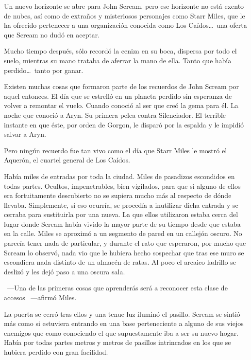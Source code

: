 \begin{prev}
    Un nuevo horizonte se abre para John Scream, pero ese horizonte no está exento de nubes, así como de extraños y misteriosos personajes como Starr Miles, que le ha ofrecido pertenecer a una organización conocida como Los Caídos\dots\ una oferta que Scream no dudó en aceptar.
\end{prev}

\noindent
Mucho tiempo después, sólo recordó la ceniza en su boca, dispersa por todo el suelo, mientras su mano trataba de aferrar la mano de ella. Tanto que había perdido\dots\ tanto por ganar.

\bigskip\noindent
Existen muchas cosas que formaron parte de los recuerdos de John Scream por aquel entonces. El día que se estrelló en un planeta perdido sin esperanza de volver a remontar el vuelo. Cuando conoció al ser que creó la gema para él. La noche que conoció a Aryn. Su primera pelea contra Silenciador. El terrible instante en que éste, por orden de Gorgon, le disparó por la espalda y le impidió salvar a Aryn.

Pero ningún recuerdo fue tan vivo como el día que Starr Miles le mostró el Aquerón, el cuartel general de Los Caídos.

Había miles de entradas por toda la ciudad. Miles de pasadizos escondidos en todas partes. Ocultos, impenetrables, bien vigilados, para que si alguno de ellos era fortuitamente descubierto no se supiera mucho más al respecto de dónde llevaba. Simplemente, si eso ocurría, se procedía a inutilizar dicha entrada y se cerraba para sustituirla por una nueva. La que ellos utilizaron estaba cerca del lugar donde Scream había vivido la mayor parte de su tiempo desde que estaba en la calle. Miles se aproximó a un segmento de pared en un callejón oscuro. No parecía tener nada de particular, y durante el rato que esperaron, por mucho que Scream lo observó, nada vio que le hubiera hecho sospechar que tras ese muro se escondiera nada distinto de un almacén de ratas. Al poco el arcaico ladrillo se deslizó y les dejó paso a una oscura sala.

~---Una de las primeras cosas que aprenderás será a reconocer esta clase de accesos ~---afirmó Miles.

La puerta se cerró tras ellos y una tenue luz iluminó el pasillo. Scream se sintió más como si estuviera entrando en una base perteneciente a alguno de sus viejos enemigos que como conociendo el que supuestamente iba a ser su nuevo hogar. Había por todas partes metros y metros de pasillos intrincados en los que se hubiera perdido con gran facilidad.

